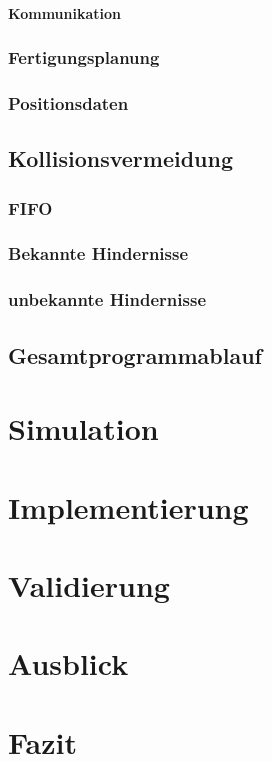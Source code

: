 \subsubsection{Kommunikation}
\subsection{Fertigungsplanung}
\subsection{Positionsdaten}

\section{Kollisionsvermeidung}
\subsection{FIFO}
\subsection{Bekannte Hindernisse}
\subsection{unbekannte Hindernisse}

\section{Gesamtprogrammablauf}

\chapter{Simulation}

\chapter{Implementierung}
\chapter{Validierung}
\chapter{Ausblick}
\chapter{Fazit}